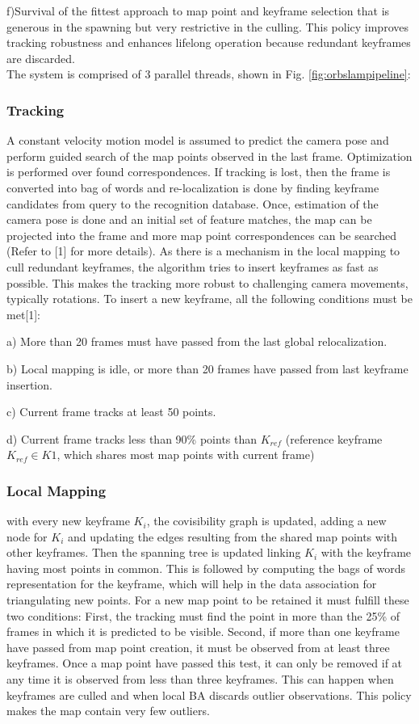 f)Survival of the fittest approach to map point and keyframe selection that is generous in the spawning but very restrictive in the culling. This policy improves tracking robustness and enhances lifelong operation because redundant keyframes are discarded.
\\


The system is comprised of 3 parallel threads, shown in Fig. \ref{fig:orbslampipeline}:

\subsubsection{Tracking} 
A constant velocity motion model is assumed to predict the camera pose and perform guided search of the map points observed in the last frame. Optimization is performed over found correspondences. If tracking is lost, then the frame is converted into bag of words and re-localization is done by finding keyframe candidates from query to the recognition database. Once, estimation of the camera pose is done and an initial set of feature matches, the map can be projected into the frame and more map point correspondences can be searched (Refer to [1] for more details). As there is a mechanism in the local mapping to cull redundant keyframes, the algorithm tries to insert keyframes as fast as possible. This makes the tracking more robust to challenging camera movements, typically rotations. To insert a new keyframe, all the following conditions must be met[1]:

 a) More than 20 frames must have passed from the last global relocalization.


 b) Local mapping is idle, or more than 20 frames have passed from last keyframe insertion.


 c) Current frame tracks at least 50 points.


 d) Current frame tracks less than 90\% points than $K_{ref}$ (reference keyframe $K_{ref} \in K1 $, which shares most map points with current frame)
\\
\subsubsection{Local Mapping} 
with every new keyframe $K_i$, the covisibility graph is updated, adding a new node for $K_i$ and updating the edges resulting from the shared map points with other keyframes. Then the spanning tree is updated linking $K_i$ with the keyframe having most points in common. This is followed by computing the bags of words representation for the keyframe, which will help in the data association for triangulating new points. For a new map point to be retained it must fulfill these two conditions: First, the tracking must find the point in more than the 25\% of frames in which it is predicted to be visible. Second, if more than one keyframe have passed from map point creation, it must be observed from at least three keyframes. Once a map point have passed this test, it can only be removed if at any time it is observed from less than three keyframes. This can happen when keyframes are culled and when local BA discards outlier observations. This policy makes the map contain very few outliers.

